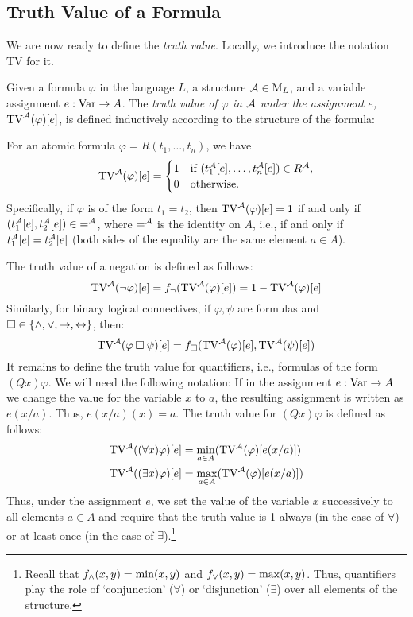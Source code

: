 \subsection{Truth Value of a Formula}\label{subsection:truth-value-of-formula}

We are now ready to define the \emph{truth value}. Locally, we introduce the notation $\mathrm{TV}$ for it.

\begin{definition}
Given a formula $\varphi$ in the language $L$, a structure $\mathcal{A}\in\operatorname{M}_L$, and a variable assignment $e:\operatorname{Var}\to A$. The \emph{truth value of $\varphi$ in $\mathcal{A}$ under the assignment $e$, $\mathrm{TV}^{\mathcal{A}}(\varphi)[e]$}, is defined inductively according to the structure of the formula:

For an atomic formula $\varphi=R(t_1,\dots,t_n)$, we have 
$$
\mathrm{TV}^{\mathcal{A}}(\varphi)[e]=
\begin{cases}
    1 & \text{if }(t_1^{\mathcal{A}}[e],\dots,t_n^{\mathcal{A}}[e])\in R^{\mathcal{A}},\\
    0 & \text{otherwise.}    
\end{cases}
$$
Specifically, if $\varphi$ is of the form $t_1=t_2$, then $\mathrm{TV}^{\mathcal{A}}(\varphi)[e]=1$ if and only if $(t_1^{\mathcal{A}}[e],t_2^{\mathcal{A}}[e])\in {=^{\mathcal{A}}}$, where $=^{\mathcal{A}}$ is the identity on $A$, i.e., if and only if $t_1^{\mathcal{A}}[e]=t_2^{\mathcal{A}}[e]$ (both sides of the equality are the same element $a\in A$).

The truth value of a negation is defined as follows:
$$
\mathrm{TV}^{\mathcal{A}}(\neg \varphi)[e]=f_\neg(\mathrm{TV}^{\mathcal{A}}(\varphi)[e])=1-\mathrm{TV}^{\mathcal{A}}(\varphi)[e]
$$
Similarly, for binary logical connectives, if $\varphi,\psi$ are formulas and ${\mathbin{\square}}\in\{{\land},{\lor},{\mathbin{\rightarrow}},{\mathbin{\leftrightarrow}}\}$, then:
$$
\mathrm{TV}^{\mathcal{A}}(\varphi\mathbin{\square}\psi)[e]=f_{\mathbin{\square}}(\mathrm{TV}^{\mathcal{A}}(\varphi)[e],\mathrm{TV}^{\mathcal{A}}(\psi)[e])
$$
It remains to define the truth value for quantifiers, i.e., formulas of the form $(Qx)\varphi$. We will need the following notation: If in the assignment $e:\operatorname{Var}\to A$ we change the value for the variable $x$ to $a$, the resulting assignment is written as $e(x/a)$. Thus, $e(x/a)(x)=a$. The truth value for $(Qx)\varphi$ is defined as follows:
\begin{align*}
    \mathrm{TV}^{\mathcal{A}}((\forall x)\varphi)[e]&=\min_{a\in A}(\mathrm{TV}^{\mathcal{A}}(\varphi)[e(x/a)])\\ 
    \mathrm{TV}^{\mathcal{A}}((\exists x)\varphi)[e]&=\max_{a\in A}(\mathrm{TV}^{\mathcal{A}}(\varphi)[e(x/a)])
\end{align*}
Thus, under the assignment $e$, we set the value of the variable $x$ successively to all elements $a\in A$ and require that the truth value is 1 always (in the case of $\forall$) or at least once (in the case of $\exists$).\footnote{Recall that $f_{\land}(x,y)=\min(x,y)$ and $f_{\lor}(x,y)=\max(x,y)$. Thus, quantifiers play the role of `conjunction' ($\forall$) or `disjunction' ($\exists$) over all elements of the structure.}
\end{definition}

